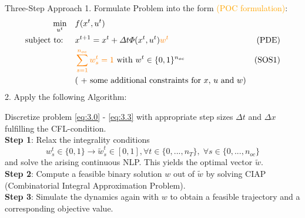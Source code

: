 \documentclass[8pt]{beamer}
\newcommand\Fontli{\fontsize{7}{7.2}\selectfont}
\begin{document}
\begin{frame}{Three-Step Approach}
\Fontli
\textcolor{bluepurp}{1. Formulate Problem into the form \textcolor{orange}{(POC formulation)}:}
\begin{alignat}{2}
\min_{u^t}   \quad & f(x^t,u^t) \label{eq:3.0} & \\
\text{subject to: } 
\quad & x^{t+1} = x^t + \Delta t \Phi(x^t,u^t) \begingroup\color{orange} w^t \label{eq:3.1} \endgroup &\text{(PDE)}\\
& \begingroup\color{orange}\sum_{s=1}^{n_{oc}} w_s^t = 1 \endgroup \text{ with } w^t \in \{0,1\}^{n_{oc}} &\text{(SOS1)} \label{eq:3.2} \\
& \text{( + some additional constraints for $x$, $u$ and $w$)} & \label{eq:3.3}
\end{alignat}
\newline
\textcolor{bluepurp}{2. Apply the following Algorithm:}
\begin{algorithm}[H]
Discretize problem \ref{eq:3.0} - \ref{eq:3.3} with appropriate step sizes $\Delta t$ and $\Delta x$ fulfilling the CFL-condition.\\
\textbf{Step 1}: Relax the integrality conditions 
\begin{equation}
w_s^t \in \{0,1\} \rightarrow \tilde{w}_s^t \in [0,1],  \forall t \in \{0,...,n_T\}, \;\forall s \in \{0,...,n_{oc}\}
\end{equation}
and solve the arising continuous NLP.  This yields the optimal vector $\tilde{w}$.
 \\
\textbf{Step 2}: Compute a feasible binary solution $w$ out of $\tilde{w}$ by solving CIAP (Combinatorial Integral Approximation Problem).\\
\textbf{Step 3}: Simulate the dynamics again with $w$ to obtain a feasible trajectory and a corresponding objective value.  
\caption{Three-Step Approach}
\end{algorithm}
\end{frame}
\end{document}
